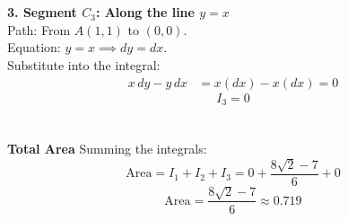 \documentclass{article}
\begin{document}
\\
\\
\textbf{3. Segment $C_3$: Along the line $y=x$}
\\
Path: From $A(1,1)$ to $(0,0)$.
\\
Equation: $y = x \implies dy = dx$.
\\
Substitute into the integral:
\begin{align*}
	x \, dy - y \, dx & = x(dx) - x(dx) = 0
\end{align*}
\[
	I_3 = 0
\]
\\
\\
\textbf{Total Area}
Summing the integrals:
\[
	\text{Area} = I_1 + I_2 + I_3 = 0 + \frac{8\sqrt{2} - 7}{6} + 0
\]
\[
	\text{Area} = \frac{8\sqrt{2} - 7}{6} \approx 0.719
\]

\pagebreak

\end{document}

